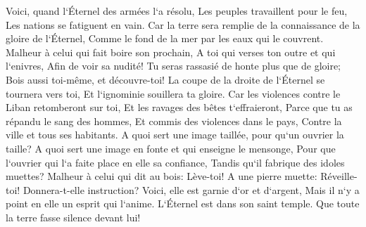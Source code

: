 \verse Voici, quand l`Éternel des armées l`a résolu, Les peuples travaillent pour le feu, Les nations se fatiguent en vain. 
\verse Car la terre sera remplie de la connaissance de la gloire de l`Éternel, Comme le fond de la mer par les eaux qui le couvrent. 
\verse Malheur à celui qui fait boire son prochain, A toi qui verses ton outre et qui l`enivres, Afin de voir sa nudité! 
\verse Tu seras rassasié de honte plus que de gloire; Bois aussi toi-même, et découvre-toi! La coupe de la droite de l`Éternel se tournera vers toi, Et l`ignominie souillera ta gloire. 
\verse Car les violences contre le Liban retomberont sur toi, Et les ravages des bêtes t`effraieront, Parce que tu as répandu le sang des hommes, Et commis des violences dans le pays, Contre la ville et tous ses habitants. 
\verse A quoi sert une image taillée, pour qu`un ouvrier la taille? A quoi sert une image en fonte et qui enseigne le mensonge, Pour que l`ouvrier qui l`a faite place en elle sa confiance, Tandis qu`il fabrique des idoles muettes? 
\verse Malheur à celui qui dit au bois: Lève-toi! A une pierre muette: Réveille-toi! Donnera-t-elle instruction? Voici, elle est garnie d`or et d`argent, Mais il n`y a point en elle un esprit qui l`anime. 
\verse L`Éternel est dans son saint temple. Que toute la terre fasse silence devant lui! 

